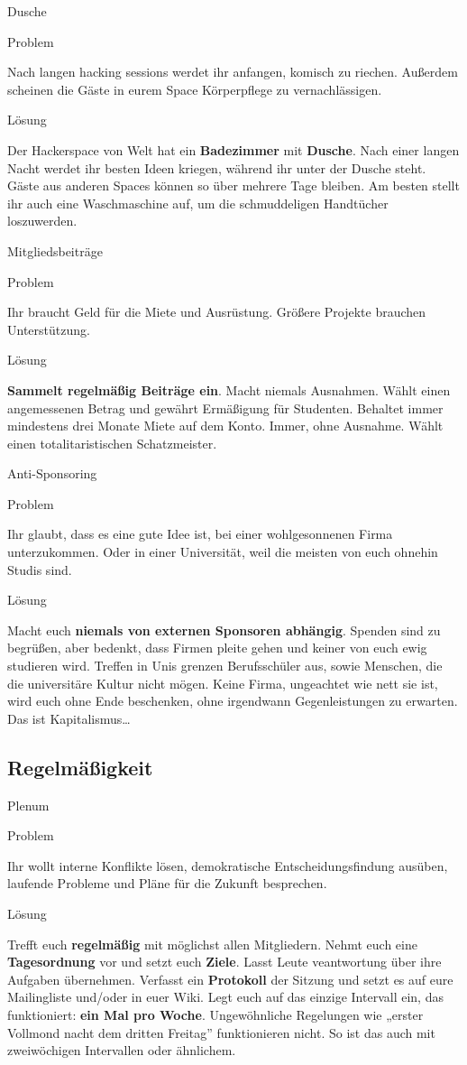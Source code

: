 \documentclass{beamer}
\newcommand{\pattern}[2]{
  \begin{alertblock}{Problem}
    #1
  \end{alertblock}
  \pause
  \begin{exampleblock}{Lösung}
    #2
  \end{exampleblock}
}
\begin{document}
  \begin{frame}{Dusche}
    \pattern{
      Nach langen hacking sessions werdet ihr anfangen, komisch zu riechen.
      Außerdem scheinen die Gäste in eurem Space Körperpflege zu
      vernachlässigen.
    }{
      Der Hackerspace von Welt hat ein \textbf{Badezimmer} mit \textbf{Dusche}.
      Nach einer langen Nacht werdet ihr besten Ideen kriegen, während ihr unter
      der Dusche steht. Gäste aus anderen Spaces können so über mehrere Tage
      bleiben. Am besten stellt ihr auch eine Waschmaschine auf, um die
      schmuddeligen Handtücher loszuwerden.
    }
  \end{frame}

  \begin{frame}{Mitgliedsbeiträge}
    \pattern{
      Ihr braucht Geld für die Miete und Ausrüstung. Größere Projekte brauchen
      Unterstützung.
    }{
      \textbf{Sammelt regelmäßig Beiträge ein}. Macht niemals Ausnahmen. Wählt
      einen angemessenen Betrag und gewährt Ermäßigung für Studenten. Behaltet
      immer mindestens drei Monate Miete auf dem Konto. Immer, ohne Ausnahme.
      Wählt einen totalitaristischen Schatzmeister.
    }
  \end{frame}

  \begin{frame}{Anti-Sponsoring}
    \pattern{
      Ihr glaubt, dass es eine gute Idee ist, bei einer wohlgesonnenen Firma
      unterzukommen. Oder in einer Universität, weil die meisten von euch
      ohnehin Studis sind.
    }{
      Macht euch \textbf{niemals von externen Sponsoren abhängig}. Spenden sind
      zu begrüßen, aber bedenkt, dass Firmen pleite gehen und keiner von euch
      ewig studieren wird. Treffen in Unis grenzen Berufsschüler aus, sowie
      Menschen, die die universitäre Kultur nicht mögen. Keine Firma, ungeachtet
      wie nett sie ist, wird euch ohne Ende beschenken, ohne irgendwann
      Gegenleistungen zu erwarten. Das ist Kapitalismus…
    }
  \end{frame}

  \subsection{Regelmäßigkeit}

  \begin{frame}{Plenum}
    \pattern{
      Ihr wollt interne Konflikte lösen, demokratische Entscheidungsfindung
      ausüben, laufende Probleme und Pläne für die Zukunft besprechen.
    }{
      Trefft euch \textbf{regelmäßig} mit möglichst allen Mitgliedern. Nehmt
      euch eine \textbf{Tagesordnung} vor und setzt euch \textbf{Ziele}. Lasst
      Leute veantwortung über ihre Aufgaben übernehmen. Verfasst ein
      \textbf{Protokoll} der Sitzung und setzt es auf eure Mailingliste und/oder
      in euer Wiki. Legt euch auf das einzige Intervall ein, das funktioniert:
      \textbf{ein Mal pro Woche}. Ungewöhnliche Regelungen wie „erster Vollmond
      nacht dem dritten Freitag” funktionieren nicht. So ist das auch mit
      zweiwöchigen Intervallen oder ähnlichem.
    }
  \end{frame}
\end{document}
